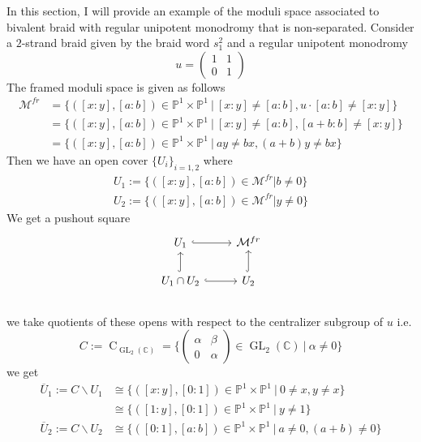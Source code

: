 \begin{example}
In this section, I will provide an example of the moduli space associated to bivalent braid with regular unipotent monodromy that is non-separated. Consider a $2$-strand braid given by the braid word $s_1^2$ and a regular unipotent monodromy
\[
	u=
	\begin{pmatrix}
		1&1\\
		0&1
	\end{pmatrix}
\] 
The framed moduli space is given as follows
\begin{align*}
	\mathcal{M}^{fr}&=\{([x:y],[a:b])\in\mathbb{P}^1\times\mathbb{P}^1~|~[x:y]\neq [a:b],u\cdot[a:b]\neq [x:y]\}\\
	&=\{([x:y],[a:b])\in\mathbb{P}^1\times\mathbb{P}^1~|~[x:y]\neq [a:b],[a+b:b]\neq [x:y]\}\\
	&=\{([x:y],[a:b])\in\mathbb{P}^1\times\mathbb{P}^1~|~ay\neq bx,(a+b)y\neq bx\}
\end{align*}
Then we have an open cover $\{U_i\}_{i=1,2}$ where
\begin{align*}
	U_1:=\{([x:y],[a:b])\in\mathcal{M}^{fr}|b\neq 0\}\\
	U_2:=\{([x:y],[a:b])\in\mathcal{M}^{fr}|y\neq 0\}
\end{align*}
We get a pushout square
\begin{displaymath}
\begin{tikzcd}
	U_1
  \arrow[hookrightarrow]{r} & \mathcal{M}^{fr} \\
	U_1\cap U_2 
  \arrow[hookrightarrow]{u} \arrow[hookrightarrow]{r} 
  & U_2
  \arrow[hookrightarrow]{u} 
\end{tikzcd} 
\end{displaymath}\\
we take quotients of these opens with respect to the centralizer subgroup of $u$ i.e.
\[
	C:=\operatorname{C}_{\operatorname{GL}_2(\mathbb{C})}
	=\{
		\begin{pmatrix}
			\alpha&\beta\\
			0&\alpha	
		\end{pmatrix}\in \operatorname{GL}_{2}(\mathbb{C})
		~|~\alpha\neq 0		
	\}
\]
we get
\begin{align*}
	\overline{U}_1:=C\backslash U_1&\cong\{([x:y],[0:1])\in\mathbb{P}^1\times\mathbb{P}^1~|~0\neq x,y\neq x\}\\
	&\cong\{([1:y],[0:1])\in\mathbb{P}^1\times\mathbb{P}^1~|~y\neq 1\}\\
	\overline{U}_2:=C\backslash U_2&\cong\{([0:1],[a:b])\in\mathbb{P}^1\times\mathbb{P}^1~|~a\neq 0,(a+b)\neq 0\}\\

\end{align*}
\end{example}
